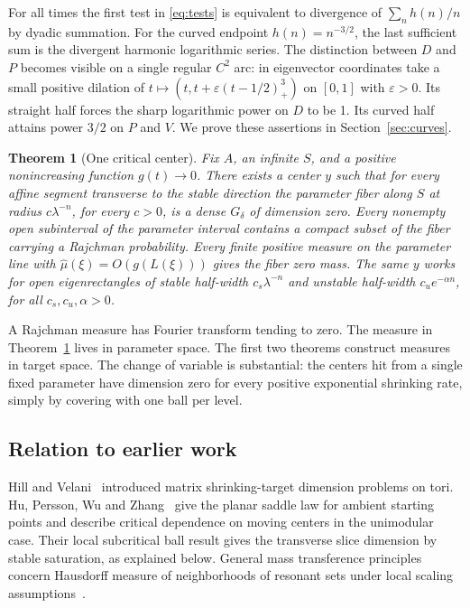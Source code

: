 \documentclass[11pt,a4paper,reqno]{amsart}
\newtheorem{theorem}{Theorem}[section]
\theoremstyle{definition}
\theoremstyle{remark}
\numberwithin{equation}{section}
\begin{document}
For all times the first test in \eqref{eq:tests} is equivalent to
divergence of \(\sum_n h(n)/n\) by dyadic summation. For the curved
endpoint \(h(n)=n^{-3/2}\), the last sufficient sum is the divergent
harmonic logarithmic series. The distinction between \(D\) and \(P\)
becomes visible on a single regular \(C^2\) arc: in eigenvector coordinates
take a small positive dilation of \(t\mapsto(t,t+\varepsilon(t-1/2)_+^3)\)
on \([0,1]\) with \(\varepsilon>0\). Its straight half forces the sharp logarithmic power
on \(D\) to be 1. Its curved half attains power \(3/2\) on \(P\) and \(V\).
We prove these assertions in Section~\ref{sec:curves}.

\begin{theorem}[One critical center]\label{thm:critical}
Fix \(A\), an infinite \(S\), and a positive nonincreasing function
\(g(t)\to0\). There exists a center \(y\) such that for every affine
segment transverse to the stable direction the parameter fiber along \(S\)
at radius \(c\lambda^{-n}\), for every \(c>0\), is a dense \(G_\delta\)
of dimension zero. Every nonempty open subinterval of the parameter interval
contains a compact subset of the fiber carrying a Rajchman probability.
Every finite positive measure on the parameter line with
\(\widehat\mu(\xi)=O(g(L(\xi)))\) gives the fiber zero mass. The same
\(y\) works for open eigenrectangles of stable half-width \(c_s\lambda^{-n}\)
and unstable half-width \(c_u e^{-\alpha n}\), for all \(c_s,c_u,\alpha>0\).
\end{theorem}

A Rajchman measure has Fourier transform tending to zero. The measure
in Theorem~\ref{thm:critical} lives in parameter space. The first two
theorems construct measures in target space. The change of variable is
substantial: the centers hit from a single fixed parameter have dimension
zero for every positive exponential shrinking rate, simply by covering
with one ball per level.

\subsection{Relation to earlier work}
Hill and Velani~\cite{HV} introduced matrix shrinking-target dimension
problems on tori. Hu, Persson, Wu and Zhang~\cite[Theorem~2.1 and
Remark~2.2]{HPWZ} give the planar saddle law for ambient starting points
and describe critical dependence on moving centers in the unimodular case.
Their local subcritical ball result gives the transverse slice dimension
by stable saturation, as explained below. General mass transference
principles concern Hausdorff measure of neighborhoods of resonant sets
under local scaling assumptions~\cite{BV,AB}.
\end{document}
